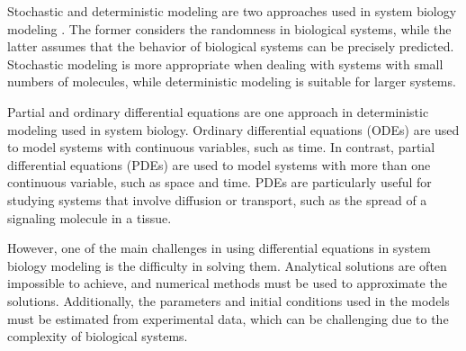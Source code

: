 Stochastic and deterministic modeling are two approaches used in system biology modeling \cite{srivastava2002stochastic}. The former considers the randomness in biological systems, while the latter assumes that the behavior of biological systems can be precisely predicted. Stochastic modeling is more appropriate when dealing with systems with small numbers of molecules, while deterministic modeling is suitable for larger systems.

Partial and ordinary differential equations are one approach in deterministic modeling used in system biology. Ordinary differential equations (ODEs) are used to model systems with continuous variables, such as time. In contrast, partial differential equations (PDEs) are used to model systems with more than one continuous variable, such as space and time. PDEs are particularly useful for studying systems that involve diffusion or transport, such as the spread of a signaling molecule in a tissue.

However, one of the main challenges in using differential equations in system biology modeling is the difficulty in solving them. Analytical solutions are often impossible to achieve, and numerical methods must be used to approximate the solutions. Additionally, the parameters and initial conditions used in the models must be estimated from experimental data, which can be challenging due to the complexity of biological systems.


